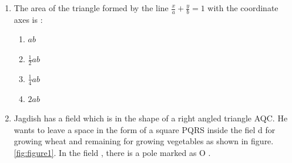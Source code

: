 %
\begin{enumerate}
        \item The area of the triangle formed by the line $ \frac{x}{a} + \frac{y}{b} = 1 $ with the coordinate axes is :
        \begin{enumerate}
             \item  $ ab $
             \item  $\frac{1}{2}ab$
             \item  $\frac{1}{4}ab$
             \item  $2ab$
        \end{enumerate}
	\item Jagdish has a field which is in the shape of a right angled triangle AQC. He wants to leave a space in the form of a square PQRS inside the fiel
d for growing wheat and remaining for growing vegetables as shown in figure. \ref{fig:figure1}. In the field , there is a pole marked as O .


\end{enumerate}
